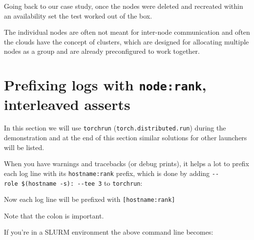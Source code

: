 \documentclass[
]{report}
\newenvironment{Shaded}{\begin{snugshade}}{\end{snugshade}}
\newcommand{\AttributeTok}[1]{\textcolor[rgb]{0.40,0.45,0.13}{#1}}
\newcommand{\DataTypeTok}[1]{\textcolor[rgb]{0.68,0.00,0.00}{#1}}
\newcommand{\ExtensionTok}[1]{\textcolor[rgb]{0.00,0.23,0.31}{#1}}
\newcommand{\FunctionTok}[1]{\textcolor[rgb]{0.28,0.35,0.67}{#1}}
\newcommand{\NormalTok}[1]{\textcolor[rgb]{0.00,0.23,0.31}{#1}}
\newcommand{\StringTok}[1]{\textcolor[rgb]{0.13,0.47,0.30}{#1}}
\newcommand{\VariableTok}[1]{\textcolor[rgb]{0.07,0.07,0.07}{#1}}
\begin{document}
Going back to our case study, once the nodes were deleted and recreated
within an availability set the test worked out of the box.

The individual nodes are often not meant for inter-node communication
and often the clouds have the concept of clusters, which are designed
for allocating multiple nodes as a group and are already preconfigured
to work together.

\section{\texorpdfstring{Prefixing logs with \texttt{node:rank},
interleaved
asserts}{Prefixing logs with node:rank, interleaved asserts}}\label{prefixing-logs-with-noderank-interleaved-asserts}

In this section we will use \texttt{torchrun}
(\texttt{torch.distributed.run}) during the demonstration and at the end
of this section similar solutions for other launchers will be listed.

When you have warnings and tracebacks (or debug prints), it helps a lot
to prefix each log line with its \texttt{hostname:rank} prefix, which is
done by adding \texttt{-\/-role\ \$(hostname\ -s):\ -\/-tee\ 3} to
\texttt{torchrun}:

\begin{Shaded}
\end{Shaded}

Now each log line will be prefixed with \texttt{{[}hostname:rank{]}}

Note that the colon is important.

If you're in a SLURM environment the above command line becomes:

\begin{Shaded}
\end{Shaded}
\end{document}
